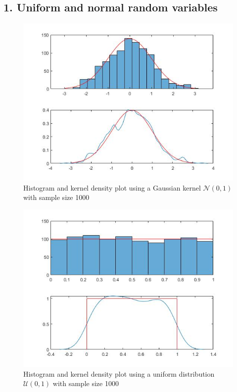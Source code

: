 \documentclass[twoside,twocolumn]{article}
\begin{document}
\subsection{1. Uniform and normal random variables}
\begin{figure}[h]
  \centering
    \includegraphics[width=\linewidth]{1normal}
  \caption{Histogram and kernel density plot using a Gaussian kernel $\mathcal{N}(0,1)$ with sample size 1000}
  \label{fig:1normal}
\end{figure}
\begin{figure}[h]
  \centering
    \includegraphics[width=\linewidth]{1uniform}
  \caption{Histogram and kernel density plot using a uniform distribution $\mathcal{U}(0,1)$ with sample size 1000}
  \label{fig:1uniform}
\end{figure}
\end{document}
